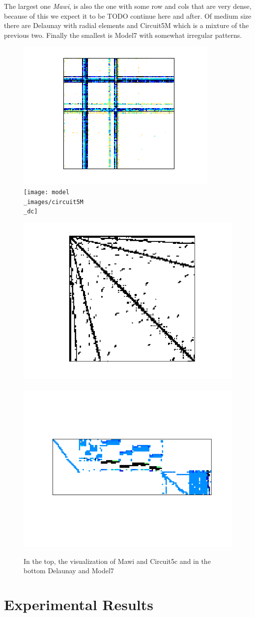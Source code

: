 \documentclass[conference]{IEEEtran}
\newcommand{\todo}[1]{\color{red} TODO #1\color{black}}
\begin{document}
 The largest one \textit{Mawi}, is also the one with some row and cols that are very dense, because of this we expect it to be \todo{continue here and after}. Of medium size there are Delaunay with radial elements and Circuit5M which is a mixture of the previous two. Finally the smallest is Model7 with somewhat irregular patterns.
\FloatBarrier
\begin{figure}[h!]
	\centering
	\includegraphics[width=0.3\linewidth]{model_images/mawi_201512020330}
	\label{dat:mawi}
	~
	\texttt{[image: model\\\_images/circuit5M\\\_dc]}
	\label{dat:circuit}

	\includegraphics[width=0.3\linewidth]{model_images/delaunay_n23}
	\label{dat:delaunay}
	~
	\includegraphics[width=0.3\linewidth]{model_images/model7}
	\label{dat:model7}

	\caption{In the top, the visualization of Mawi and Circuit5c and in the bottom Delaunay and Model7}
	\label{img:data-vis}
\end{figure}





\FloatBarrier

\section{Experimental Results}
\end{document}
